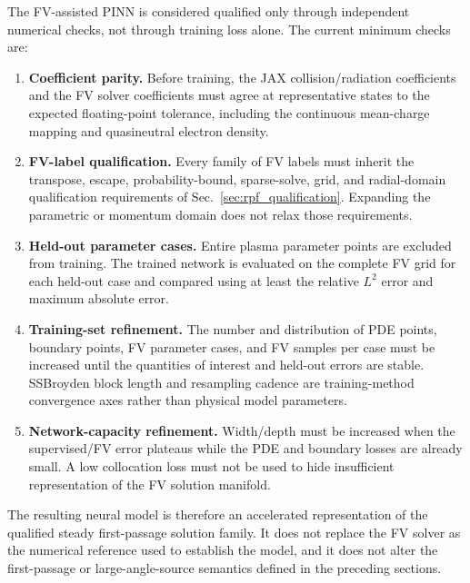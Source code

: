 \documentclass[11pt]{article}
\begin{document}
The FV-assisted PINN is considered qualified only through independent numerical checks,
not through training loss alone.  The current minimum checks are:
\begin{enumerate}
 \item \textbf{Coefficient parity.}  Before training, the JAX collision/radiation
       coefficients and the FV solver coefficients must agree at representative states
       to the expected floating-point tolerance, including the continuous mean-charge
       mapping and quasineutral electron density.

 \item \textbf{FV-label qualification.}  Every family of FV labels must inherit the
       transpose, escape, probability-bound, sparse-solve, grid, and radial-domain
       qualification requirements of Sec.~\ref{sec:rpf_qualification}.  Expanding the
       parametric or momentum domain does not relax those requirements.

 \item \textbf{Held-out parameter cases.}  Entire plasma parameter points are excluded
       from training.  The trained network is evaluated on the complete FV grid for each
       held-out case and compared using at least the relative $L^2$ error and maximum
       absolute error.

 \item \textbf{Training-set refinement.}  The number and distribution of PDE points,
       boundary points, FV parameter cases, and FV samples per case must be increased
       until the quantities of interest and held-out errors are stable.  SSBroyden block
       length and resampling cadence are training-method convergence axes rather than
       physical model parameters.

 \item \textbf{Network-capacity refinement.}  Width/depth must be increased when the
       supervised/FV error plateaus while the PDE and boundary losses are already small.
       A low collocation loss must not be used to hide insufficient representation of the
       FV solution manifold.
\end{enumerate}

The resulting neural model is therefore an accelerated representation of the qualified
steady first-passage solution family.  It does not replace the FV solver as the numerical
reference used to establish the model, and it does not alter the first-passage or
large-angle-source semantics defined in the preceding sections.
\end{document}
